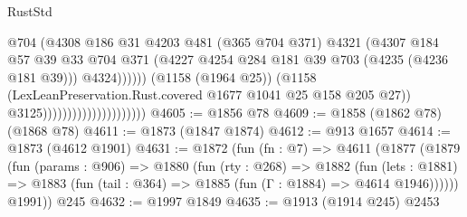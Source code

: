 \begin{lexlean}{RustStd}
\begin{coremodule}
                                                      @704
                                                      (@4308
                                                        @186
                                                        @31
                                                        @4203
                                                        @481
                                                        (@365 @704 @371)
                                                        @4321
                                                        (@4307
                                                          @184
                                                          @57
                                                          @39
                                                          @33
                                                          @704
                                                          @371
                                                          (@4227
                                                            @4254
                                                            @284
                                                            @181
                                                            @39
                                                            @703
                                                            (@4235 (@4236 @181 @39)))
                                                          @4324))))))
                                              (@1158 (@1964 @25))
                                              (@1158
                                                (LexLeanPreservation.Rust.covered
                                                  @1677
                                                  @1041
                                                  @25
                                                  @158
                                                  @205
                                                  @27))
                                              @3125)))))))))))))))))))))
@4605 := @1856 @78
@4609 := @1858 (@1862 @78) (@1868 @78)
@4611 := @1873 (@1847 @1874)
@4612 := @913 @1657
@4614 := @1873 (@4612 @1901)
@4631 := @1872
    (fun (fn : @7) =>
    @4611
      (@1877
        (@1879
          (fun (params : @906) =>
          @1880
            (fun (rty : @268) =>
            @1882
              (fun (lets : @1881) =>
              @1883 (fun (tail : @364) => @1885 (fun (Γ : @1884) => @4614 @1946))))))
        @1991))
    @245
@4632 := @1997 @1849
@4635 := @1913 (@1914 @245) @2453

\end{coremodule}
\end{lexlean}
